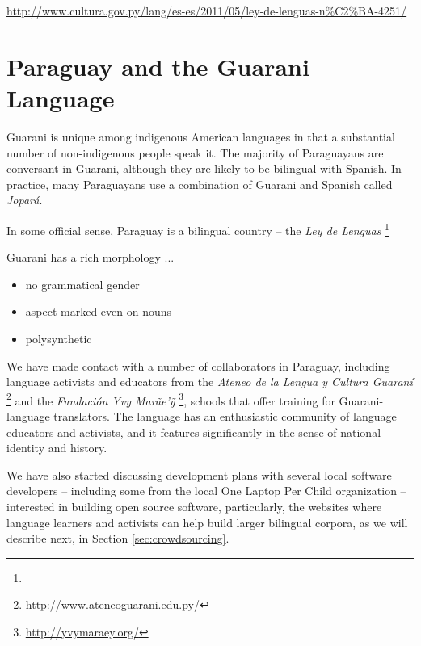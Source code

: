 \urldef{\leydelenguas}\url{http://www.cultura.gov.py/lang/es-es/2011/05/ley-de-lenguas-n%C2%BA-4251/}

\section{Paraguay and the Guarani Language}
Guarani is unique among indigenous American languages in that a substantial
number of non-indigenous people speak it.  The majority of Paraguayans are
conversant in Guarani, although they are likely to be bilingual with Spanish.
In practice, many Paraguayans use a combination of Guarani and Spanish called
\emph{Jopar{\'a}}.

In some official sense, 
Paraguay is a bilingual country -- the 
\emph{Ley de Lenguas} \footnote{\leydelenguas}

Guarani has a rich morphology ...

\begin{itemize}
\item no grammatical gender
\item aspect marked even on nouns
\item polysynthetic
\end{itemize}

We have made contact with a number of collaborators in Paraguay, including
language activists and educators from the \emph{Ateneo de la Lengua y Cultura
Guaraní}
\footnote{\url{http://www.ateneoguarani.edu.py/}}
and the
\emph{Fundación Yvy Marãe'{\~y}} \footnote{\url{http://yvymaraey.org/}},
schools that offer training
for Guarani-language translators.
The language has an enthusiastic community of language educators and activists,
and it features significantly in the sense of national identity and history.

We have also started discussing development plans with several local software
developers -- including some from the local One Laptop Per Child organization
-- interested in building open source software, particularly,
the websites where language learners and activists can help
build larger bilingual corpora, as we will describe next, in Section
\ref{sec:crowdsourcing}.
